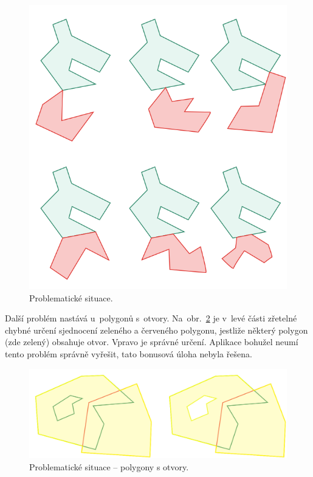 \documentclass[a4paper, 12pt, oneside, titlepage]{article} %
\begin{document}
\begin{figure}[!htb]
	\centering
	\includegraphics[scale=0.6]{obrazky/problem_sit.png} 
	\caption{Problematické situace.
	}
	\label{fig:problem_sit}
\end{figure} 
\FloatBarrier


Další problém nastává u~polygonů s~otvory. Na~obr.~\ref{fig:problem_sit_dve} je v~levé části zřetelné chybné určení sjednocení zeleného a červeného polygonu, jestliže některý polygon (zde zelený) obsahuje otvor. Vpravo je správné určení. Aplikace bohužel neumí tento problém správně vyřešit, tato bonusová úloha nebyla řešena.

\begin{figure}[!htb]
	\centering
	\includegraphics[scale=0.4]{obrazky/problem_sit_dve.png} 
	\caption{Problematické situace -- polygony s otvory.
	}
	\label{fig:problem_sit_dve}
\end{figure} 
\FloatBarrier
\end{document}
